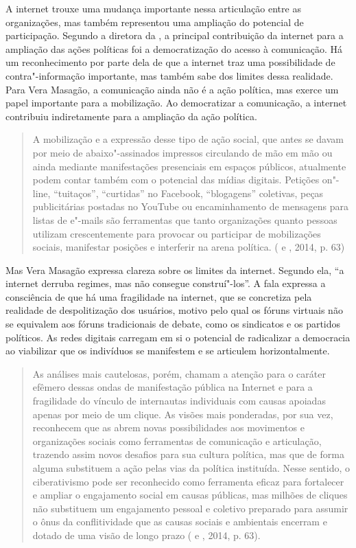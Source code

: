 A internet trouxe uma mudança importante nessa articulação entre as
organizações, mas também representou uma ampliação do potencial de
participação. Segundo a diretora da , a principal contribuição da
internet para a ampliação das ações políticas foi a democratização do
acesso à comunicação. Há um reconhecimento por parte dela de que a
internet traz uma possibilidade de contra"-informação importante, mas
também sabe dos limites dessa realidade. Para Vera Masagão, a
comunicação ainda não é a ação política, mas exerce um papel importante
para a mobilização. Ao democratizar a comunicação, a internet contribuiu
indiretamente para a ampliação da ação política.

\begin{quote}
A mobilização e a expressão desse tipo de ação social, que antes se
davam por meio de abaixo"-assinados impressos circulando de mão em mão ou
ainda mediante manifestações presenciais em espaços públicos, atualmente
podem contar também com o potencial das mídias digitais. Petições
on"-line, ``tuitaços'', ``curtidas'' no Facebook, ``blogagens''
coletivas, peças publicitárias postadas no YouTube ou encaminhamento de
mensagens para listas de e"-mails são ferramentas que tanto organizações
quanto pessoas utilizam crescentemente para provocar ou participar de
mobilizações sociais, manifestar posições e interferir na arena
política. ( e , 2014, p. 63)
\end{quote}

Mas Vera Masagão expressa clareza sobre os limites da internet. Segundo
ela, ``a internet derruba regimes, mas não consegue construí"-los''. A
fala expressa a consciência de que há uma fragilidade na internet, que
se concretiza pela realidade de despolitização dos usuários, motivo pelo
qual os fóruns virtuais não se equivalem aos fóruns tradicionais de
debate, como os sindicatos e os partidos políticos. As redes digitais
carregam em si o potencial de radicalizar a democracia ao viabilizar que
os indivíduos se manifestem e se articulem horizontalmente.

\begin{quote}
As análises mais cautelosas, porém, chamam a atenção para o caráter
efêmero dessas ondas de manifestação pública na Internet e para a
fragilidade do vínculo de internautas individuais com causas apoiadas
apenas por meio de um clique. As visões mais ponderadas, por sua vez,
reconhecem que as  abrem novas possibilidades aos movimentos e
organizações sociais como ferramentas de comunicação e articulação,
trazendo assim novos desafios para sua cultura política, mas que de
forma alguma substituem a ação pelas vias da política instituída. Nesse
sentido, o ciberativismo pode ser reconhecido como ferramenta eficaz
para fortalecer e ampliar o engajamento social em causas públicas, mas
milhões de cliques não substituem um engajamento pessoal e coletivo
preparado para assumir o ônus da conflitividade que as causas sociais e
ambientais encerram e dotado de uma visão de longo prazo ( e
, 2014, p. 63).
\end{quote}

